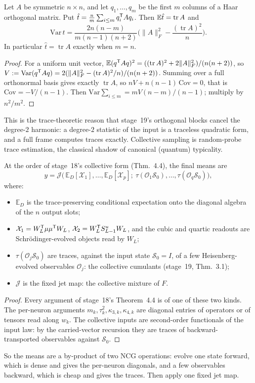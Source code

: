 \begin{theorem}\label{thm:hutch}
Let $A$ be symmetric $n\times n$, and let $q_1,\dots,q_m$ be the first $m$ columns of a Haar orthogonal matrix. Put
$\hat t=\frac nm\sum_{i\le m}q_i^{\mathsf T} Aq_i$. Then $\mathbb{E}\hat t=\operatorname{tr}A$ and
\[
\mathrm{Var}\,\hat t=\frac{2n(n-m)}{m(n-1)(n+2)}\Big(\|A\|_F^2-\frac{(\operatorname{tr}A)^2}n\Big).
\]
In particular $\hat t=\operatorname{tr}A$ exactly when $m=n$.
\end{theorem}
\begin{proof}
For a uniform unit vector, $\mathbb{E}(q^{\mathsf T} Aq)^2=((\operatorname{tr}A)^2+2\|A\|_F^2)/(n(n+2))$, so
$V:=\mathrm{Var}(q^{\mathsf T} Aq)=2(\|A\|_F^2-(\operatorname{tr}A)^2/n)/(n(n+2))$. Summing over a full orthonormal basis gives exactly
$\operatorname{tr}A$, so $nV+n(n-1)\,\mathrm{Cov}=0$, that is $\mathrm{Cov}=-V/(n-1)$. Then
$\mathrm{Var}\sum_{i\le m}=mV(n-m)/(n-1)$; multiply by $n^2/m^2$.
\end{proof}

This is the trace-theoretic reason that stage~19's orthogonal blocks cancel the degree-$2$ harmonic: a
degree-$2$ statistic of the input is a traceless quadratic form, and a full frame computes traces exactly.
Collective sampling is random-probe trace estimation, the classical shadow of canonical (quantum)
typicality.

\begin{proposition}\label{prop:side}
At the order of stage~18's collective form (Thm.~4.4), the final means are
\[
y=\mathcal J\big(\,\mathbb E_D[\mathcal X_1],\dots,\mathbb E_D[\mathcal X_p];\ \tau(\mathcal O_1\mathcal S_0),\dots,\tau(\mathcal O_q\mathcal S_0)\big),
\]
where:
\begin{itemize}[leftmargin=1.2em,itemsep=0pt,topsep=1pt]
\item $\mathbb E_D$ is the trace-preserving conditional expectation onto the diagonal algebra of the $n$ output
slots;
\item $\mathcal X_1=W_L^{\mathsf T}\mu\mu^{\mathsf T} W_L$, $\mathcal X_2=W_L^{\mathsf T} S^u_{L-1}W_L$, and the cubic and quartic readouts are Schr\"odinger-evolved
objects read by $W_L$;
\item $\tau(\mathcal O_j\mathcal S_0)$ are traces, against the input state $\mathcal S_0=I$, of a few Heisenberg-evolved observables
$\mathcal O_j$: the collective cumulants (stage~19, Thm.~3.1);
\item $\mathcal J$ is the fixed jet map: the collective mixture of $F$.
\end{itemize}
\end{proposition}
\begin{proof}
Every argument of stage~18's Theorem~4.4 is of one of these two kinds. The per-neuron arguments
$m_k,\tau_k^2,\kappa_{3,k},\kappa_{4,k}$ are diagonal entries of operators or of tensors read along $w_k$. The collective
inputs are second-order functionals of the input law: by the carried-vector recursion they are traces of
backward-transported observables against $\mathcal S_0$.
\end{proof}

So the means are a by-product of two NCG operations: evolve one state forward, which is dense and gives the
per-neuron diagonals, and a few observables backward, which is cheap and gives the traces. Then apply one
fixed jet map.
